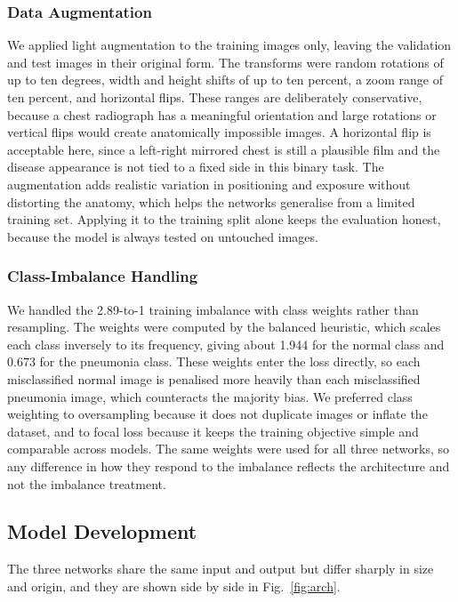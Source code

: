 \documentclass[preprint,12pt]{elsarticle}
\begin{document}
\subsubsection{Data Augmentation}
We applied light augmentation to the training images only, leaving the validation and test images in their original form.
The transforms were random rotations of up to ten degrees, width and height shifts of up to ten percent, a zoom range of ten percent, and horizontal flips.
These ranges are deliberately conservative, because a chest radiograph has a meaningful orientation and large rotations or vertical flips would create anatomically impossible images.
A horizontal flip is acceptable here, since a left-right mirrored chest is still a plausible film and the disease appearance is not tied to a fixed side in this binary task.
The augmentation adds realistic variation in positioning and exposure without distorting the anatomy, which helps the networks generalise from a limited training set.
Applying it to the training split alone keeps the evaluation honest, because the model is always tested on untouched images.

\subsubsection{Class-Imbalance Handling}
We handled the 2.89-to-1 training imbalance with class weights rather than resampling.
The weights were computed by the balanced heuristic, which scales each class inversely to its frequency, giving about 1.944 for the normal class and 0.673 for the pneumonia class.
These weights enter the loss directly, so each misclassified normal image is penalised more heavily than each misclassified pneumonia image, which counteracts the majority bias.
We preferred class weighting to oversampling because it does not duplicate images or inflate the dataset, and to focal loss because it keeps the training objective simple and comparable across models.
The same weights were used for all three networks, so any difference in how they respond to the imbalance reflects the architecture and not the imbalance treatment.

\subsection{Model Development}
The three networks share the same input and output but differ sharply in size and origin, and they are shown side by side in Fig.~\ref{fig:arch}.
\end{document}
